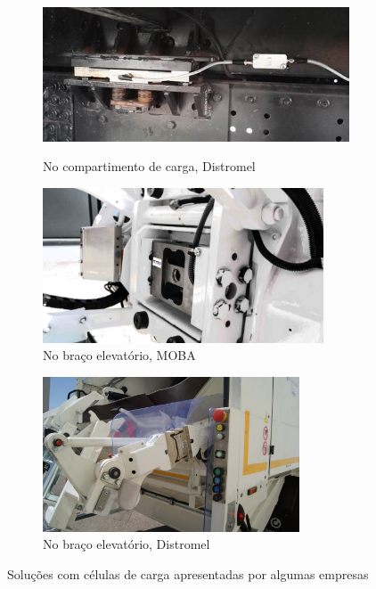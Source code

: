 \documentclass[11pt, a4paper, oneside]{book}
\begin{document}
\begin{figure}[ht]
  \centering
    \begin{subfigure}[b]{1.0\textwidth}
    \centering
    \includegraphics[height = 47mm]{img/distromel-chassis.jpg}
    \caption{No compartimento de carga, Distromel \cite{distromel-news}}
  \end{subfigure}

  \vspace{0.5em}

  \begin{subfigure}[b]{0.52\textwidth}
    \centering
    \includegraphics[height = 46mm]{img/moba-rear-elevator.jpg}
    \caption{No braço elevatório, MOBA \cite{moba-dynamic-scale}}
  \end{subfigure}
  \begin{subfigure}[b]{0.47\textwidth}
    \centering
    \includegraphics[height = 46mm]{img/distromel-rear-elevator.jpg}
    \caption{No braço elevatório, Distromel \cite{distromel-news}}
  \end{subfigure}
  \caption{Soluções com células de carga apresentadas por algumas empresas}
\end{figure}
\end{document}
